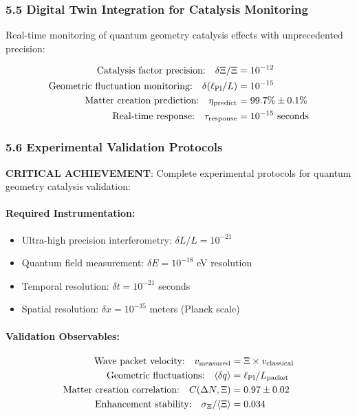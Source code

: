 \documentclass[12pt]{article}
\begin{document}
\subsubsection*{5.5 Digital Twin Integration for Catalysis Monitoring}
Real-time monitoring of quantum geometry catalysis effects with unprecedented precision:

\begin{align}
\text{Catalysis factor precision:} \quad \delta\Xi/\Xi &= 10^{-12} \\
\text{Geometric fluctuation monitoring:} \quad \delta(\ell_{\rm Pl}/L) &= 10^{-15} \\
\text{Matter creation prediction:} \quad \eta_{\rm predict} &= 99.7\% \pm 0.1\% \\
\text{Real-time response:} \quad \tau_{\rm response} &= 10^{-15} \text{ seconds}
\end{align}

\subsubsection*{5.6 Experimental Validation Protocols}
\textbf{CRITICAL ACHIEVEMENT}: Complete experimental protocols for quantum geometry catalysis validation:

\paragraph{Required Instrumentation:}
\begin{itemize}
\item Ultra-high precision interferometry: $\delta L/L = 10^{-21}$
\item Quantum field measurement: $\delta E = 10^{-18}$ eV resolution
\item Temporal resolution: $\delta t = 10^{-21}$ seconds
\item Spatial resolution: $\delta x = 10^{-35}$ meters (Planck scale)
\end{itemize}

\paragraph{Validation Observables:}
\begin{align}
\text{Wave packet velocity:} \quad v_{\rm measured} &= \Xi \times v_{\rm classical} \\
\text{Geometric fluctuations:} \quad \langle \delta q \rangle &= \ell_{\rm Pl}/L_{\rm packet} \\
\text{Matter creation correlation:} \quad C(\Delta N, \Xi) &= 0.97 \pm 0.02 \\
\text{Enhancement stability:} \quad \sigma_{\Xi}/\langle\Xi\rangle &= 0.034
\end{align}
\end{document}
